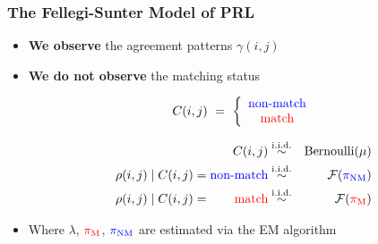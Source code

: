 \documentclass[9pt]{beamer}
\begin{document}

\begin{frame}
\frametitle{The Fellegi-Sunter Model of PRL}
 
  \begin{itemize}
	 \item \textbf{We observe} the agreement patterns $\gamma(i, j)$ 
	 \item \textbf{We do not observe} the matching status

           $$C(i,j) \ = \ \left\{ \begin{array}{cl} 
           				\text{\color{blue}{non-match}}  \\ 
                                          \text{\color{red}{match}} 
                                          \end{array} \right.$$ \pause
\begin{tcolorbox}[colback=blue!0,colframe={cobalt},title= {\bf Mixture Model}]
{\small 
\begin{center}
\begin{eqnarray*}
  C(i, j) & \iid & \text{Bernoulli}(\mu) \\ 
  \rho(i,j) \mid C(i, j) = \text{\color{blue}{non-match}} & \iid &  \mathcal{F}({ \color{blue}{\pi}_{\text{\color{blue}{NM}}} }) \\ 
  \rho(i,j) \mid C(i, j) = \text{\color{white}{non-}\color{red}{match}} & \iid &  \mathcal{F}( {\color{red}{\pi}_{\text{\color{red}{M}}} }) 
\end{eqnarray*} 
\end{center}
}  
\end{tcolorbox}
  \item Where 
  {\normalsize $\lambda$, ${\color{red}{\pi}_{\text{\color{red}{M}}}}$, ${\color{blue}{\pi}_{\text{\color{blue}{NM}}}}$  are estimated via the EM algorithm} 
  \end{itemize}

\end{frame}

\end{document}
